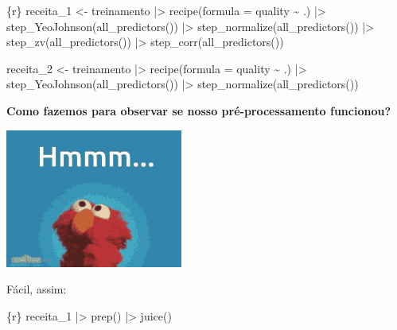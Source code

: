 \documentclass[
  letterpaper,
  DIV=11,
  numbers=noendperiod,
  oneside]{scrartcl}
\newenvironment{Shaded}{\begin{snugshade}}{\end{snugshade}}
\newcommand{\AttributeTok}[1]{\textcolor[rgb]{0.40,0.45,0.13}{#1}}
\newcommand{\FunctionTok}[1]{\textcolor[rgb]{0.28,0.35,0.67}{#1}}
\newcommand{\InformationTok}[1]{\textcolor[rgb]{0.37,0.37,0.37}{#1}}
\newcommand{\NormalTok}[1]{\textcolor[rgb]{0.00,0.23,0.31}{#1}}
\newcommand{\OtherTok}[1]{\textcolor[rgb]{0.00,0.23,0.31}{#1}}
\newcommand{\SpecialCharTok}[1]{\textcolor[rgb]{0.37,0.37,0.37}{#1}}
\begin{document}
\begin{Shaded}
\begin{Highlighting}[]
\InformationTok{\textasciigrave{}\textasciigrave{}\textasciigrave{}\{r\}}
\NormalTok{receita\_1 }\OtherTok{\textless{}{-}} 
\NormalTok{  treinamento }\SpecialCharTok{|\textgreater{}} 
    \FunctionTok{recipe}\NormalTok{(}\AttributeTok{formula =}\NormalTok{ quality }\SpecialCharTok{\textasciitilde{}}\NormalTok{ .) }\SpecialCharTok{|\textgreater{}}
    \FunctionTok{step\_YeoJohnson}\NormalTok{(}\FunctionTok{all\_predictors}\NormalTok{()) }\SpecialCharTok{|\textgreater{}}
    \FunctionTok{step\_normalize}\NormalTok{(}\FunctionTok{all\_predictors}\NormalTok{()) }\SpecialCharTok{|\textgreater{}}
    \FunctionTok{step\_zv}\NormalTok{(}\FunctionTok{all\_predictors}\NormalTok{()) }\SpecialCharTok{|\textgreater{}}
    \FunctionTok{step\_corr}\NormalTok{(}\FunctionTok{all\_predictors}\NormalTok{())}

\NormalTok{receita\_2 }\OtherTok{\textless{}{-}} 
\NormalTok{  treinamento }\SpecialCharTok{|\textgreater{}} 
    \FunctionTok{recipe}\NormalTok{(}\AttributeTok{formula =}\NormalTok{ quality }\SpecialCharTok{\textasciitilde{}}\NormalTok{ .) }\SpecialCharTok{|\textgreater{}}
    \FunctionTok{step\_YeoJohnson}\NormalTok{(}\FunctionTok{all\_predictors}\NormalTok{()) }\SpecialCharTok{|\textgreater{}}
    \FunctionTok{step\_normalize}\NormalTok{(}\FunctionTok{all\_predictors}\NormalTok{())}
\InformationTok{\textasciigrave{}\textasciigrave{}\textasciigrave{}}
\end{Highlighting}
\end{Shaded}

\textbf{Como fazemos para observar se nosso pré-processamento
funcionou?}

\includegraphics{../gifs/hum.gif}

Fácil, assim:

\begin{Shaded}
\begin{Highlighting}[]
\InformationTok{\textasciigrave{}\textasciigrave{}\textasciigrave{}\{r\}}
\NormalTok{receita\_1 }\SpecialCharTok{|\textgreater{}} 
  \FunctionTok{prep}\NormalTok{() }\SpecialCharTok{|\textgreater{}} 
  \FunctionTok{juice}\NormalTok{()}
\InformationTok{\textasciigrave{}\textasciigrave{}\textasciigrave{}}
\end{Highlighting}
\end{Shaded}
\end{document}

